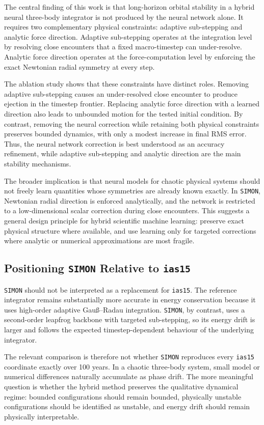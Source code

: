 \documentclass[12pt]{article}
\begin{document}
The central finding of this work is that long-horizon orbital stability in a hybrid
neural three-body integrator is not produced by the neural network alone. It requires
two complementary physical constraints: adaptive sub-stepping and analytic force
direction. Adaptive sub-stepping operates at the integration level by resolving close
encounters that a fixed macro-timestep can under-resolve. Analytic force direction
operates at the force-computation level by enforcing the exact Newtonian radial
symmetry at every step.

The ablation study shows that these constraints have distinct roles. Removing adaptive
sub-stepping causes an under-resolved close encounter to produce ejection in the timestep
frontier. Replacing analytic force direction with a learned direction also leads to
unbounded motion for the tested initial condition. By contrast, removing the neural
correction while retaining both physical constraints preserves bounded dynamics, with
only a modest increase in final RMS error. Thus, the neural network correction is best
understood as an accuracy refinement, while adaptive sub-stepping and analytic direction
are the main stability mechanisms.

The broader implication is that neural models for chaotic physical systems should not
freely learn quantities whose symmetries are already known exactly. In \texttt{SIMON},
Newtonian radial direction is enforced analytically, and the network is restricted to a
low-dimensional scalar correction during close encounters. This suggests a general design
principle for hybrid scientific machine learning: preserve exact physical structure where
available, and use learning only for targeted corrections where analytic or numerical
approximations are most fragile.

\subsection{Positioning \texttt{SIMON} Relative to \texttt{ias15}}

\texttt{SIMON} should not be interpreted as a replacement for \texttt{ias15}. The reference
integrator remains substantially more accurate in energy conservation because it uses
high-order adaptive Gau\ss--Radau integration. \texttt{SIMON}, by contrast, uses a
second-order leapfrog backbone with targeted sub-stepping, so its energy drift is larger
and follows the expected timestep-dependent behaviour of the underlying integrator.

The relevant comparison is therefore not whether \texttt{SIMON} reproduces every
\texttt{ias15} coordinate exactly over 100 years. In a chaotic three-body system, small
model or numerical differences naturally accumulate as phase drift. The more meaningful
question is whether the hybrid method preserves the qualitative dynamical regime:
bounded configurations should remain bounded, physically unstable configurations should
be identified as unstable, and energy drift should remain physically interpretable.
\end{document}
